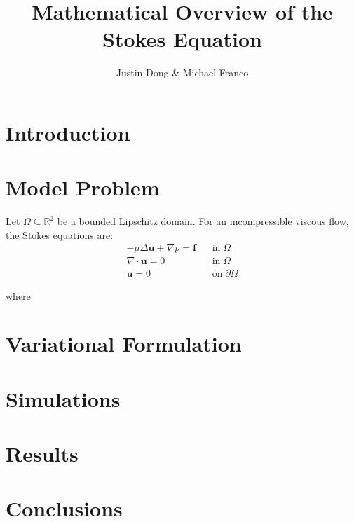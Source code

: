\documentclass[10pt]{article}
\title{Mathematical Overview of the Stokes Equation}
\author{Justin Dong \& Michael Franco}
\numberwithin{equation}{section}
\begin{document}
	\maketitle
	
	\section{Introduction}
	
	\section{Model Problem}
	
	Let $\Omega \subseteq \mathbb{R}^{2}$ be a bounded Lipschitz domain. For an incompressible viscous flow, the Stokes equations are:
	\begin{align}
		-\mu\Delta \mathbf{u} + \nabla p = \mathbf{f} \;\;\;&\text{in}\;\Omega\\
		\nabla\cdot\mathbf{u} = 0 \;\;\;&\text{in}\;\Omega\\
		\mathbf{u} = 0 \;\;\;&\text{on}\;\partial\Omega
	\end{align}
	
	\noindent where
	
	\section{Variational Formulation}
	
	\section{Simulations}
	
	\section{Results}
	
	\section{Conclusions}
	
\end{document}
